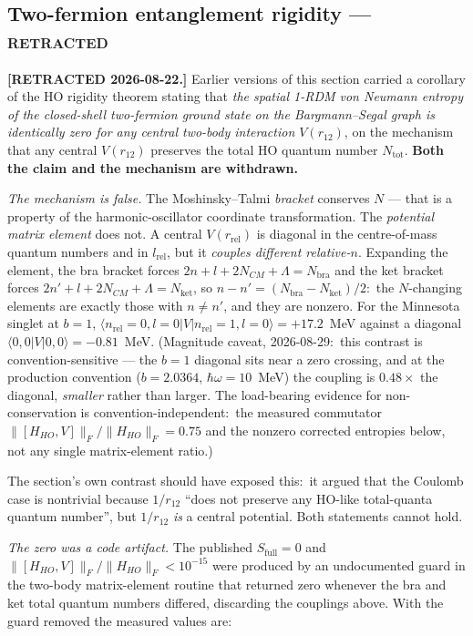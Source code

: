 \documentclass[twocolumn,pra,amsmath,amssymb,superscriptaddress]{revtex4-2}
\begin{document}
\subsection{Two-fermion entanglement rigidity --- \textsc{retracted}}
\label{sec:entanglement-rigidity}

\textbf{[RETRACTED 2026-08-22.]}  Earlier versions of this section carried a
corollary of the HO rigidity theorem stating that \emph{the spatial 1-RDM von
Neumann entropy of the closed-shell two-fermion ground state on the
Bargmann--Segal graph is identically zero for any central two-body interaction
$V(r_{12})$}, on the mechanism that any central $V(r_{12})$ preserves the total
HO quantum number $N_{\mathrm{tot}}$.  \textbf{Both the claim and the mechanism
are withdrawn.}

\emph{The mechanism is false.}  The Moshinsky--Talmi \emph{bracket} conserves
$N$ --- that is a property of the harmonic-oscillator coordinate
transformation.  The \emph{potential matrix element} does not.  A central
$V(r_{\mathrm{rel}})$ is diagonal in the centre-of-mass quantum numbers and in
$l_{\mathrm{rel}}$, but it \emph{couples different relative-$n$}.  Expanding
the element, the bra bracket forces
$2n + l + 2N_{CM} + \Lambda = N_{\mathrm{bra}}$ and the ket bracket forces
$2n' + l + 2N_{CM} + \Lambda = N_{\mathrm{ket}}$, so
$n - n' = (N_{\mathrm{bra}} - N_{\mathrm{ket}})/2$:\ the $N$-changing elements
are exactly those with $n \neq n'$, and they are nonzero.  For the Minnesota
singlet at $b=1$,
$\langle n_{\mathrm{rel}}{=}0, l{=}0 \lvert V \rvert n_{\mathrm{rel}}{=}1,
l{=}0 \rangle = +17.2$~MeV against a diagonal
$\langle 0,0 \lvert V \rvert 0,0 \rangle = -0.81$~MeV.  (Magnitude caveat,
2026-08-29:\ this contrast is convention-sensitive --- the $b{=}1$ diagonal
sits near a zero crossing, and at the production convention
($b = 2.0364$, $\hbar\omega = 10$~MeV) the coupling is $0.48\times$ the
diagonal, \emph{smaller} rather than larger.  The load-bearing evidence for
non-conservation is convention-independent:\ the measured commutator
$\lVert[H_{HO},V]\rVert_F/\lVert H_{HO}\rVert_F = 0.75$ and the nonzero
corrected entropies below, not any single matrix-element ratio.)

The section's own contrast should have exposed this:\ it argued that the
Coulomb case is nontrivial because $1/r_{12}$ ``does not preserve any HO-like
total-quanta quantum number'', but $1/r_{12}$ \emph{is} a central potential.
Both statements cannot hold.

\emph{The zero was a code artifact.}  The published $S_{\mathrm{full}} = 0$ and
$\lVert[H_{HO},V]\rVert_F / \lVert H_{HO}\rVert_F < 10^{-15}$ were produced by
an undocumented guard in the two-body matrix-element routine that returned
zero whenever the bra and ket total quantum numbers differed, discarding the
couplings above.  With the guard removed the measured values are:
\end{document}
